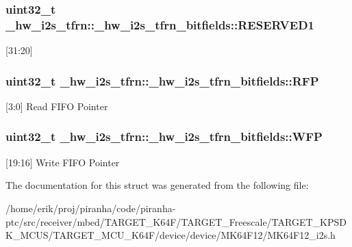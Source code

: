 \subsubsection[{\texorpdfstring{R\+E\+S\+E\+R\+V\+E\+D1}{RESERVED1}}]{\setlength{\rightskip}{0pt plus 5cm}uint32\+\_\+t \+\_\+hw\+\_\+i2s\+\_\+tfrn\+::\+\_\+hw\+\_\+i2s\+\_\+tfrn\+\_\+bitfields\+::\+R\+E\+S\+E\+R\+V\+E\+D1}\hypertarget{struct__hw__i2s__tfrn_1_1__hw__i2s__tfrn__bitfields_a736d6161c17a6aea196c00676783e588}{}\label{struct__hw__i2s__tfrn_1_1__hw__i2s__tfrn__bitfields_a736d6161c17a6aea196c00676783e588}
\mbox{[}31\+:20\mbox{]} 
\subsubsection[{\texorpdfstring{R\+FP}{RFP}}]{\setlength{\rightskip}{0pt plus 5cm}uint32\+\_\+t \+\_\+hw\+\_\+i2s\+\_\+tfrn\+::\+\_\+hw\+\_\+i2s\+\_\+tfrn\+\_\+bitfields\+::\+R\+FP}\hypertarget{struct__hw__i2s__tfrn_1_1__hw__i2s__tfrn__bitfields_a8fcdbf4b6426c71828e7591bc00557e2}{}\label{struct__hw__i2s__tfrn_1_1__hw__i2s__tfrn__bitfields_a8fcdbf4b6426c71828e7591bc00557e2}
\mbox{[}3\+:0\mbox{]} Read F\+I\+FO Pointer 
\subsubsection[{\texorpdfstring{W\+FP}{WFP}}]{\setlength{\rightskip}{0pt plus 5cm}uint32\+\_\+t \+\_\+hw\+\_\+i2s\+\_\+tfrn\+::\+\_\+hw\+\_\+i2s\+\_\+tfrn\+\_\+bitfields\+::\+W\+FP}\hypertarget{struct__hw__i2s__tfrn_1_1__hw__i2s__tfrn__bitfields_a0a1be7deddeb937e74c3e323c294a9eb}{}\label{struct__hw__i2s__tfrn_1_1__hw__i2s__tfrn__bitfields_a0a1be7deddeb937e74c3e323c294a9eb}
\mbox{[}19\+:16\mbox{]} Write F\+I\+FO Pointer 

The documentation for this struct was generated from the following file\+:\begin{DoxyCompactItemize}
\item 
/home/erik/proj/piranha/code/piranha-\/ptc/src/receiver/mbed/\+T\+A\+R\+G\+E\+T\+\_\+\+K64\+F/\+T\+A\+R\+G\+E\+T\+\_\+\+Freescale/\+T\+A\+R\+G\+E\+T\+\_\+\+K\+P\+S\+D\+K\+\_\+\+M\+C\+U\+S/\+T\+A\+R\+G\+E\+T\+\_\+\+M\+C\+U\+\_\+\+K64\+F/device/device/\+M\+K64\+F12/M\+K64\+F12\+\_\+i2s.\+h\end{DoxyCompactItemize}
